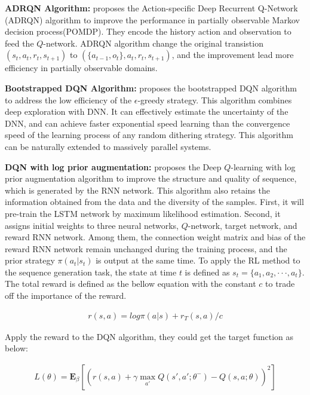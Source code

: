 \documentclass{article}
\begin{document}
{\bf ADRQN Algorithm:}
\citep{zhu2017improving} proposes the Action-specific Deep Recurrent Q-Network (ADRQN) algorithm to improve the performance in partially observable Markov decision process(POMDP). They encode the history action and observation to feed the $Q$-network. ADRQN algorithm change the original transistion $(s_t,a_t,r_t,s_{t+1})$ to $(\{a_{t-1},o_t\},a_t,r_t,s_{t+1})$, and the improvement lead more efficiency in partially observable domains.

{\bf Bootstrapped DQN Algorithm:}
\citep{osband2016deep} proposes the bootstrapped DQN algorithm to address the low efficiency of the $\epsilon$-greedy strategy. This algorithm combines deep exploration with DNN. It can effectively estimate the uncertainty of the DNN, and can achieve faster exponential speed learning than the convergence speed of the learning process of any random dithering strategy. This algorithm can be naturally extended to massively parallel systems.

{\bf DQN with log prior augmentation:}
\citep{jaques2017sequence} proposes the Deep $Q$-learning with log prior augmentation algorithm to improve the structure and quality of sequence, which is generated by the RNN network. This algorithm also retains the information obtained from the data and the diversity of the samples. First, it will pre-train the LSTM network by maximum likelihood estimation. Second, it assigns initial weights to three neural networks, $Q$-network, target network, and reward RNN network. Among them, the connection weight matrix and bias of the reward RNN network remain unchanged during the training process, and the prior strategy $\pi(a_t|s_t)$ is output at the same time.
To apply the RL method to the sequence generation task, the state at time $t$ is defined as $s_t=\{a_1,a_2,\cdot \cdot \cdot, a_t\}$. The total reward is defined as the bellow equation with the constant $c$ to trade off the importance of the reward.

\begin{align}
r(s,a)=log\pi(a|s)+r_T(s,a)/c
\end{align}

Apply the reward to the DQN algorithm, they could get the target function as below:

\begin{align}
L(\theta)=\mathbf{E}_\beta[(r(s,a)+\gamma \operatorname*{max}_{a'}Q(s',a';\theta^-)-Q(s,a;\theta))^2]
\end{align}
\end{document}
